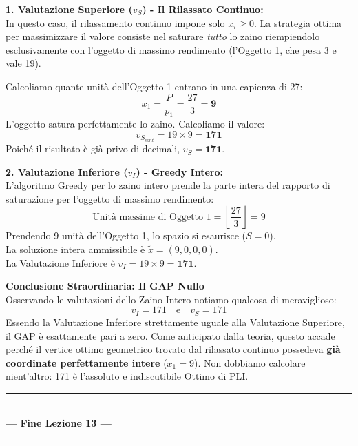 \documentclass[12pt, a4paper]{article}
\begin{document}
	\textbf{1. Valutazione Superiore ($v_S$) - Il Rilassato Continuo:}\\
	In questo caso, il rilassamento continuo impone solo $x_i \geq 0$. La strategia ottima per massimizzare il valore consiste nel saturare \textit{tutto} lo zaino riempiendolo esclusivamente con l'oggetto di massimo rendimento (l'Oggetto 1, che pesa 3 e vale 19).
	
	Calcoliamo quante unità dell'Oggetto 1 entrano in una capienza di 27:
	\[
	x_1 = \frac{P}{p_1} = \frac{27}{3} = \mathbf{9}
	\]
	L'oggetto satura perfettamente lo zaino. Calcoliamo il valore:
	\[
	v_{S_{cont}} = 19 \times 9 = \mathbf{171}
	\]
	Poiché il risultato è già privo di decimali, $v_S = \mathbf{171}$. 
	
	\textbf{2. Valutazione Inferiore ($v_I$) - Greedy Intero:}\\
	L'algoritmo Greedy per lo zaino intero prende la parte intera del rapporto di saturazione per l'oggetto di massimo rendimento:
	\[
	\text{Unità massime di Oggetto 1} = \left\lfloor \frac{27}{3} \right\rfloor = 9
	\]
	Prendendo 9 unità dell'Oggetto 1, lo spazio si esaurisce ($S = 0$). \\
	La soluzione intera ammissibile è $\tilde{x} = (9, 0, 0, 0)$. \\
	La Valutazione Inferiore è $v_I = 19 \times 9 = \mathbf{171}$.
	
	\vspace{0.4cm}
	\textbf{Conclusione Straordinaria: Il GAP Nullo}\\
	Osservando le valutazioni dello Zaino Intero notiamo qualcosa di meraviglioso:
	\[
	v_I = 171 \quad \text{e} \quad v_S = 171
	\]
	Essendo la Valutazione Inferiore strettamente uguale alla Valutazione Superiore, il GAP è esattamente pari a zero. Come anticipato dalla teoria, questo accade perché il vertice ottimo geometrico trovato dal rilassato continuo possedeva \textbf{già coordinate perfettamente intere} ($x_1 = 9$). 
	Non dobbiamo calcolare nient'altro: 171 è l'assoluto e indiscutibile Ottimo di PLI.
	
	\vspace{1.5cm}
	\begin{center}
		\rule{0.65\textwidth}{1pt} \\
		\vspace{0.4cm}
		\textcolor{titlecolor}{\LARGE \textbf{--- Fine Lezione 13 ---}} \\
		\vspace{0.2cm}
		\rule{0.65\textwidth}{1pt}
	\end{center}
	\newpage
	
\end{document}
